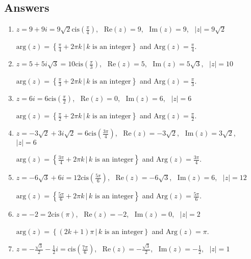 \documentclass{ximera}
\begin{document}
\subsection{Answers}

\begin{enumerate}

\item $z = 9 + 9i = 9\sqrt{2}\text{cis}\left(\frac{\pi}{4}\right)$, \, $\text{Re}(z) = 9$, \, $\text{Im}(z) = 9$, \, $|z| = 9\sqrt{2}$

$\text{arg}(z) = \left\{\frac{\pi}{4} + 2\pi k \, | \, \text{$k$ is an integer} \right\}$ and $\text{Arg}(z) = \frac{\pi}{4}$.

\item $z = 5+5i\sqrt{3} = 10\text{cis}\left(\frac{\pi}{3}\right)$, \, $\text{Re}(z) = 5$, \, $\text{Im}(z) = 5\sqrt{3}$, \, $|z| = 10$

$\text{arg}(z) = \left\{\frac{\pi}{3} + 2\pi k \, | \, \text{$k$ is an integer} \right\}$ and $\text{Arg}(z) = \frac{\pi}{3}$.

\item $z = 6i = 6\text{cis}\left(\frac{\pi}{2}\right)$, \, $\text{Re}(z) = 0$, \, $\text{Im}(z) = 6$, \, $|z| = 6$

$\text{arg}(z) = \left\{\frac{\pi}{2} + 2\pi k \, | \, \text{$k$ is an integer} \right\}$ and $\text{Arg}(z) = \frac{\pi}{2}$.

\item $z = -3\sqrt{2} + 3i\sqrt{2} = 6\text{cis}\left(\frac{3\pi}{4}\right)$, \, $\text{Re}(z) = -3\sqrt{2}$, \, $\text{Im}(z) =3\sqrt{2}$, \, $|z| = 6$

$\text{arg}(z) = \left\{\frac{3\pi}{4} + 2\pi k \, | \, \text{$k$ is an integer} \right\}$ and $\text{Arg}(z) = \frac{3\pi}{4}$.

\item $z =  -6\sqrt{3} + 6i = 12\text{cis}\left(\frac{5\pi}{6}\right)$, \, $\text{Re}(z) = -6\sqrt{3}$, \, $\text{Im}(z) =6$, \, $|z| = 12$

$\text{arg}(z) = \left\{\frac{5\pi}{6} + 2\pi k \, | \, \text{$k$ is an integer} \right\}$ and $\text{Arg}(z) = \frac{5\pi}{6}$.

\item $z =  -2 = 2\text{cis}\left(\pi\right)$, \, $\text{Re}(z) = -2$, \, $\text{Im}(z) =0$, \, $|z| = 2$

$\text{arg}(z) = \left\{(2k+1)\pi \, | \, \text{$k$ is an integer} \right\}$ and $\text{Arg}(z) = \pi$.

\item $z = -\frac{\sqrt{3}}{2} - \frac{1}{2}i = \text{cis}\left(\frac{7\pi}{6}\right)$, \, $\text{Re}(z) = -\frac{\sqrt{3}}{2}$, \, $\text{Im}(z) = -\frac{1}{2}$, \, $|z| = 1$


\end{enumerate}
\end{document}

